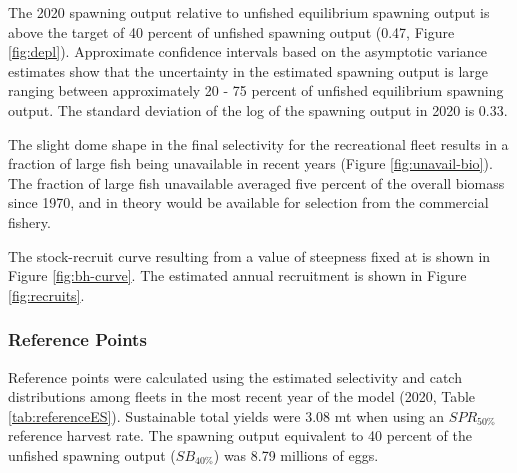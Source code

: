 \documentclass[11pt,
  english,
  a4paper,
]{article}
\begin{document}
\leavevmode\tagmcend\tagstructend\par


The 2020 spawning output relative to unfished equilibrium spawning output is above the target of 40 percent of unfished spawning output (0.47, Figure \ref{fig:depl}). Approximate confidence intervals based on the asymptotic variance estimates show that the uncertainty in the estimated spawning output is large ranging between approximately 20 - 75 percent of unfished equilibrium spawning output. The standard deviation of the log of the spawning output in 2020 is 0.33.

\leavevmode\tagmcend\tagstructend\par


The slight dome shape in the final selectivity for the recreational fleet results in a fraction of large fish being unavailable in recent years (Figure \ref{fig:unavail-bio}). The fraction of large fish unavailable averaged five percent of the overall biomass since 1970, and in theory would be available for selection from the commercial fishery.

\leavevmode\tagmcend\tagstructend\par


The stock-recruit curve resulting from a value of steepness fixed at is shown in Figure \ref{fig:bh-curve}. The estimated annual recruitment is shown in Figure \ref{fig:recruits}.

\leavevmode\tagmcend\tagstructend\par


\hypertarget{reference-points}{%
\subsubsection{Reference Points}\label{reference-points}}

\leavevmode\tagmcend\tagstructend


Reference points were calculated using the estimated selectivity and catch distributions among fleets in the most recent year of the model (2020, Table \ref{tab:referenceES}). Sustainable total yields were 3.08 mt when using an {\(SPR_{50\%}\)\leavevmode\tagmcend\tagstructend} reference harvest rate. The spawning output equivalent to 40 percent of the unfished spawning output ({\(SB_{40\%}\)\leavevmode\tagmcend\tagstructend}) was 8.79 millions of eggs.
\end{document}
